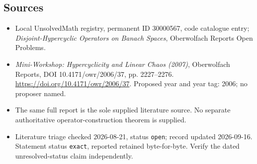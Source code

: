 \documentclass[11pt]{article}
\begin{document}
\subsection{Sources}
\begin{itemize}\item Local UnsolvedMath registry, permanent ID 30000567, code catalogue entry; \emph{Disjoint-Hypercyclic Operators on Banach Spaces}, Oberwolfach Reports Open Problems.\item \emph{Mini-Workshop: Hypercyclicity and Linear Chaos (2007)}, Oberwolfach Reports, DOI 10.4171/owr/2006/37, pp. 2227--2276. \url{https://doi.org/10.4171/owr/2006/37}. Proposed year and year tag: 2006; no proposer named.\item The same full report is the sole supplied literature source. No separate authoritative operator-construction theorem is supplied.\item Literature triage checked 2026-08-21, status \texttt{open}; record updated 2026-09-16. Statement status \texttt{exact}, reported retained byte-for-byte. Verify the dated unresolved-status claim independently.\end{itemize}
\end{document}
